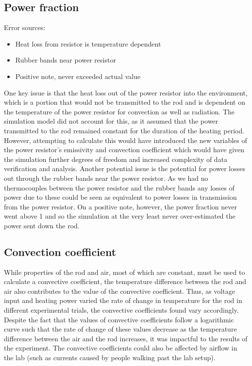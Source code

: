 \documentclass[letterpaper,titlepage,oneside]{report}
\begin{document}
\subsection*{Power fraction}
Error sources:
\begin{itemize}
\item Heat loss from resistor is temperature dependent
\item Rubber bands near power resistor 
\item Positive note, never exceeded actual value
\end{itemize}
One key issue is that the heat loss out of the power resistor
into the environment, which is a portion that would not be
transmitted to the rod and is dependent on the temperature of the
power resistor for convection as well as radiation.
The simulation model did not account for this, as it assumed
that the power transmitted to the rod remained constant for the
duration of the heating period. However, attempting to calculate
this would have introduced the new variables of the power
resistor's emissivity and convection coefficient which would
have given the simulation further degrees of freedom and increased
complexity of data verification and analysis.
Another potential issue is the potential for power losses out
through the rubber bands near the power resistor. As we had no
thermocouples between the power resistor and the rubber bands
any losses of power due to these could be seen as equivalent to
power losses in transmission from the power resistor.
On a positive note, however, the power fraction never went above
1 and so the simulation at the very least never over-estimated
the power sent down the rod.

\subsection*{Convection coefficient}
While properties of the rod and air, most of which are constant,
must be used to calculate a convective coefficient, the temperature
difference between the rod and air also contributes to the value
of the convective coefficient. Thus, as voltage input and heating
power varied the rate of change in temperature for the rod in
different experimental trials, the convective coefficients found
vary accordingly. Despite the fact that the values of
convective coefficients follow a logarithmic curve such that
the rate of change of these values decrease as the
temperature difference between the air and the rod increases,
it was impactful to the results of the experiment.
The convective coefficients could also be affected by airflow
in the lab (such as currents caused by people walking past the
lab setup). 
\end{document}

